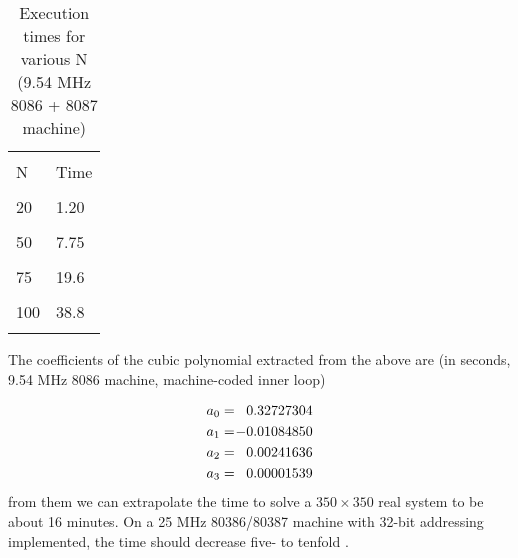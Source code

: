 \begin{table}
    \centering
    \caption{Execution times for various N (9.54 MHz 8086 + 8087 machine)}
        \bigskip
    \label{tbl:09_01} 
    \setlength{\tabcolsep}{40pt}
        \begin{tabular}{|ll|}
            \hline & \\
            N   &  Time\\
            & \\
            20  &  1.20\\
            & \\
            50  &  7.75\\
            & \\
            75  &  19.6\\
            & \\
            100 &  38.8\\
            & \\
            \hline
        \end{tabular}
\end{table}

The coefficients of the cubic polynomial extracted from the above
are (in seconds, 9.54 MHz 8086 machine, machine-coded inner loop)

\begin{equation*}
    \begin{split}
        a_0 &=\;\; 0.32727304\\
        a_1 &=\;\; \llap{$-$}0.01084850\\
        a_2 &=\;\; 0.00241636\\
        a_3 &=\;\; 0.00001539
    \end{split}
\end{equation*}
from them we can extrapolate the time to solve a $350 \times 350$ real
system to be about 16 minutes. On a 25 MHz 80386/80387 machine with 32-bit addressing implemented, the time should
decrease five- to tenfold .

